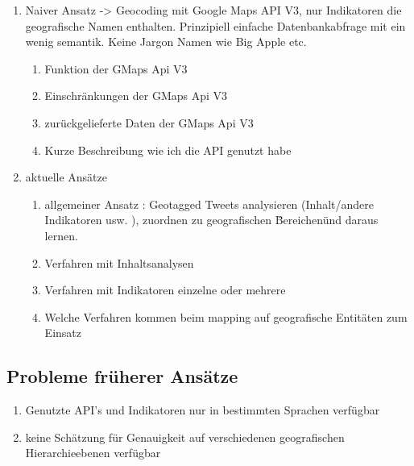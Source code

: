 		\begin{enumerate}
			\item Naiver Ansatz -> Geocoding mit Google Maps API V3, nur Indikatoren die geografische Namen enthalten. 
					Prinzipiell einfache Datenbankabfrage mit ein wenig semantik. 
					Keine Jargon Namen wie Big Apple etc.
				\begin{enumerate}
					\item Funktion der GMaps Api V3
					\item Einschränkungen der GMaps Api V3
					\item zurückgelieferte Daten der GMaps Api V3
					\item Kurze Beschreibung wie ich die API genutzt habe
				\end{enumerate}
			\item aktuelle Ansätze
				\begin{enumerate}
					\item{ 
					allgemeiner Ansatz : Geotagged Tweets analysieren (Inhalt/andere Indikatoren usw. ), zuordnen zu geografischen \"Bereichen\" und daraus lernen.}
					\item Verfahren mit Inhaltsanalysen
					\item Verfahren mit Indikatoren einzelne oder mehrere
					\item Welche Verfahren kommen beim mapping auf  geografische Entitäten zum Einsatz
				\end{enumerate}
		\end{enumerate}

		\subsection{Probleme früherer Ansätze}
			\begin{enumerate}
				\item{Genutzte API's und Indikatoren nur in bestimmten Sprachen verfügbar}
				\item{keine Schätzung für Genauigkeit auf verschiedenen geografischen Hierarchieebenen verfügbar}  
			\end{enumerate}

	
	
	

	
